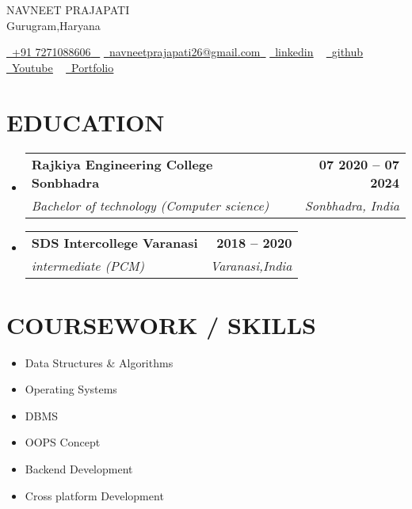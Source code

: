 \documentclass[letterpaper,11pt]{article}
\makeatletter
\newcommand{\resumeSubheading}[4]{
  \vspace{-2pt}\item
    \begin{tabular*}{1.0\textwidth}[t]{l@{\extracolsep{\fill}}r}
      \textbf{\large#1} & \textbf{\small #2} \\
      \textit{\large#3} & \textit{\small #4} \\
      
    \end{tabular*}\vspace{-7pt}
}
\newcommand{\resumeSubHeadingListStart}{\begin{itemize}[leftmargin=0.0in, label={}]}
\newcommand{\resumeSubHeadingListEnd}{\end{itemize}}
\makeatother
\begin{document}


\begin{center}
    {\Huge \scshape NAVNEET PRAJAPATI} \\ \vspace{1pt}
    Gurugram,Haryana \\ \vspace{1pt}
    \small 
    
    \href{tel:+91 7271088606}{ \raisebox{-0.1\height}\faPhone\ \underline{+91 7271088606} ~} \href{navneetprajapati26@gmail.com}{\raisebox{-0.2\height}\faEnvelope\  \underline{navneetprajapati26@gmail.com}~}
    \href{https://www.linkedin.com/in/navneetprajapati26/}{\raisebox{-0.2\height}\faLinkedin\ \underline{linkedin}} ~
    \href{https://github.com/navneetprajapati26}{\raisebox{-0.2\height}\faGithub\ \underline{github}} ~
    \href{https://www.youtube.com/@asyncapp}{\raisebox{-0.2\height}\faYoutube\ \underline{Youtube}} ~
    \href{https://navneet.asyncapps.com/}{\raisebox{-0.2\height}\faGlobe\ \underline{Portfolio}}
    
    \vspace{-5pt}
\end{center}

\section{EDUCATION}
  \resumeSubHeadingListStart
    \resumeSubheading
      {Rajkiya Engineering College Sonbhadra}{07 2020 -- 07 2024}
      {Bachelor of technology (Computer science) }{Sonbhadra, India}
  \resumeSubHeadingListEnd
  
  \resumeSubHeadingListStart
    \resumeSubheading
      {SDS Intercollege Varanasi}{2018 -- 2020}
      {intermediate (PCM)  }{Varanasi,India}
  \resumeSubHeadingListEnd

\section{COURSEWORK / SKILLS}
        \begin{multicols}{4}
            \begin{itemize}[itemsep=-2pt, parsep=5pt]
                \item Data Structures \& Algorithms
                \item Operating Systems
                \item DBMS
                \item OOPS Concept
                \item Backend Development 
                \item Cross platform Development
            \end{itemize}
        \end{multicols}
        \vspace*{2.0\multicolsep}
\end{document}
